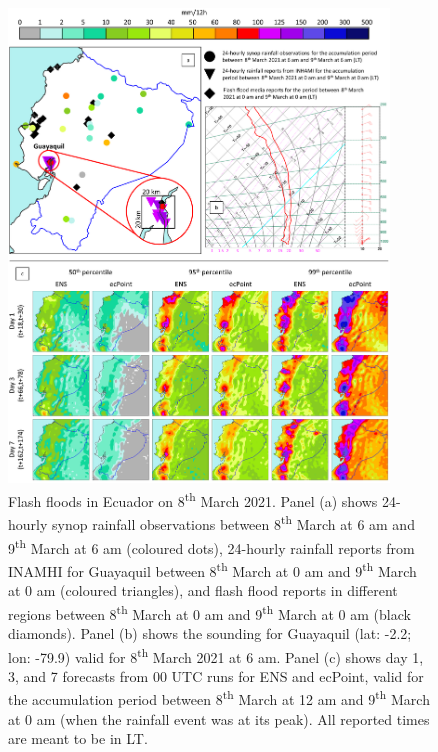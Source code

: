 \documentclass[techmemo]{ecmwfrep}%
\begin{document}
\begin{figure}
\centering
\includegraphics[width=0.9\textwidth]{Figures/14_CASESTUDY_Floods_March_2021.png}
\caption{Flash floods in Ecuador on 8\textsuperscript{th} March 2021. Panel (a) shows 24-hourly synop rainfall observations between 8\textsuperscript{th} March at 6 am and 9\textsuperscript{th} March at 6 am (coloured dots), 24-hourly rainfall reports from INAMHI for Guayaquil between 8\textsuperscript{th} March at 0 am and 9\textsuperscript{th} March at 0 am (coloured triangles), and flash flood reports in different regions between 8\textsuperscript{th} March at 0 am and 9\textsuperscript{th} March at 0 am (black diamonds). Panel (b) shows the sounding for Guayaquil (lat: -2.2; lon: -79.9) valid for 8\textsuperscript{th} March 2021 at 6 am. Panel (c) shows day 1, 3, and 7 forecasts from 00 UTC runs for ENS and ecPoint, valid for the accumulation period between 8\textsuperscript{th} March at 12 am and 9\textsuperscript{th} March at 0 am (when the rainfall event was at its peak). All reported times are meant to be in LT.}
\label{fig:Case_Study}
\end{figure}

\end{document}
